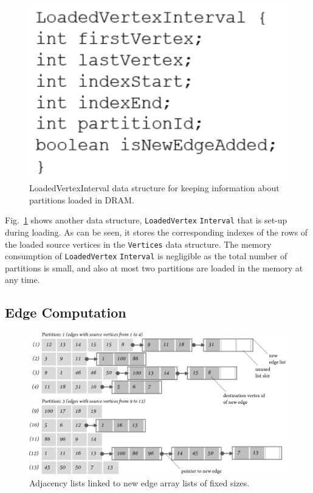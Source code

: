 \documentclass[10pt,preprint]{sigplanconf}
\begin{document}
\begin{figure}[!htbp]
	\begin{center}
		\includegraphics[scale=0.55]{Figures/lvi.pdf}
	\end{center}
	\caption{LoadedVertexInterval data structure for keeping information about partitions loaded in DRAM.}
	\label{fig-lvi}
\end{figure}

Fig.~\ref{fig-lvi} shows another data structure, \texttt{LoadedVertex} \texttt{Interval} that is set-up during loading. As can be seen, it stores the corresponding indexes of the rows of the loaded source vertices in the \texttt{Vertices} data structure. The memory consumption of \texttt{LoadedVertex} \texttt{Interval} is negligible as the total number of partitions is small, and also at most two partitions are loaded in the memory at any time. 

\subsection{Edge Computation}
\label{subsec:edgcomp}

\begin{figure}[!htbp]
	\begin{center}
		\includegraphics[scale=0.44]{Figures/newedgelsts.pdf}
	\end{center}
	\caption{Adjacency lists linked to new edge array lists of fixed sizes.}
	\label{fig-newedgelsts}
\end{figure}
\end{document}
